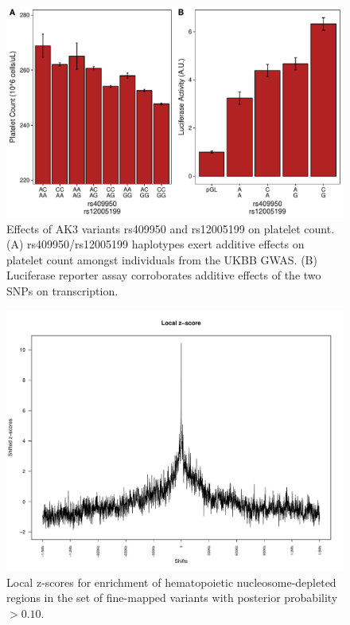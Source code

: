 \documentclass{article}\usepackage[]{graphicx}\usepackage[]{color}
\makeatletter
\def\maxwidth{ %
  \ifdim\Gin@nat@width>\linewidth
    \linewidth
  \else
    \Gin@nat@width
  \fi
}
\newenvironment{knitrout}{}{} %
\makeatother
\begin{document}
\begin{knitrout}
\color{fgcolor}\begin{figure}[H]

{\centering \includegraphics[width=\maxwidth]{figure/ak3Phenos/Reporter-1} 

}

\caption[Effects of AK3 variants rs409950 and rs12005199 on platelet count]{Effects of AK3 variants rs409950 and rs12005199 on platelet count. (A) rs409950/rs12005199 haplotypes exert additive effects on platelet count amongst individuals from the UKBB GWAS. (B) Luciferase reporter assay corroborates additive effects of the two SNPs on transcription.}\label{fig:ak3Phenos/Reporter}
\end{figure}


\end{knitrout}

\begin{figure}
\centering
\includegraphics[width=\linewidth]{staticFigures/FINEMAP_PP10_localzscore_10000.pdf}
\caption{Local z-scores for enrichment of hematopoietic nucleosome-depleted regions in the set of fine-mapped variants with posterior probability $> 0.10$.}
\end{figure} 
\end{document}
